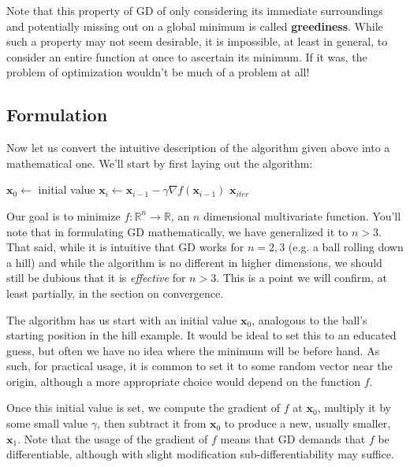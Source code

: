 \documentclass{article}
\renewcommand\vec{\mathbf}
\newcommand{\R}{\mathbb R}
\begin{document}
  Note that this property of GD of only considering its immediate surroundings and potentially missing out on a global minimum is called \textbf{greediness}. While such a property may not seem desirable, it is impossible, at least in general, to consider an entire function at once to ascertain its minimum. If it was, the problem of optimization wouldn't be much of a problem at all!

\subsection*{Formulation}
  Now let us convert the intuitive description of the algorithm given above into a mathematical one. We'll start by first laying out the algorithm:
  \vspace{5mm}

  \begin{algorithmic}
    \State $\vec x_0\gets$ initial value
      \State $\vec x_i\gets\vec x_{i-1} - \gamma\nabla f(\vec x_{i-1})$
    \EndFor
    \State \Return $\vec x_{iter}$
  \EndFunction
  \end{algorithmic}
  \vspace{5mm}

  Our goal is to minimize $f:\R^n\to\R$, an $n$ dimensional multivariate function. You'll note that in formulating GD mathematically, we have generalized it to $n>3$. That said, while it is intuitive that GD works for $n=2,3$ (e.g. a ball rolling down a hill) and while the algorithm is no different in higher dimensions, we should still be dubious that it is \textit{effective} for $n>3$. This is a point we will confirm, at least partially, in the section on convergence.

  The algorithm has us start with an initial value $\vec x_0$, analogous to the ball's starting position in the hill example. It would be ideal to set this to an educated guess, but often we have no idea where the minimum will be before hand. As such, for practical usage, it is common to set it to some random vector near the origin, although a more appropriate choice would depend on the function $f$.

  Once this initial value is set, we compute the gradient of $f$ at $\vec x_0$, multiply it by some small value $\gamma$, then subtract it from $\vec x_0$ to produce a new, usually smaller, $\vec x_1$. Note that the usage of the gradient of $f$ means that GD demands that $f$ be differentiable, although with slight modification sub-differentiability may suffice.
  
\end{document}
